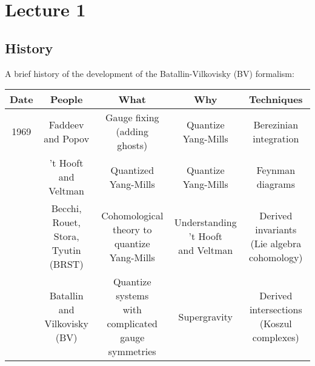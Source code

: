 \chapter{Lecture 1}

\section{History}

A brief history of the development of the Batallin-Vilkovisky (BV) formalism:

\begin{center}
  \begin{tabular}{ccccc}
    Date & People & What & Why & Techniques \\
    \midrule
    1969 &
    \makecell{ Faddeev \\ and Popov } &
    \makecell{ Gauge fixing \\ (adding ghosts) } &
    \makecell{ Quantize \\ Yang-Mills } &
    \makecell{ Berezinian \\ integration } \\
    \addlinespace
    1973 & 
    \makecell{ 't Hooft and \\ Veltman } &
    \makecell{ Quantized \\ Yang-Mills } &
    \makecell{ Quantize \\ Yang-Mills } &
    \makecell{ Feynman \\ diagrams } \\
    \addlinespace
    1975 &
    \makecell{ Becchi, Rouet, \\ Stora, Tyutin \\ (BRST) } &
    \makecell{ Cohomological \\ theory to quantize \\ Yang-Mills } &
    \makecell{ Understanding \\ 't Hooft \\ and Veltman } &
    \makecell{ Derived invariants \\ (Lie algebra \\ cohomology) } \\
    \addlinespace
    1981 &
    \makecell{ Batallin and \\ Vilkovisky \\ (BV) } &
    \makecell{ Quantize systems \\ with complicated \\ gauge symmetries } &
    Supergravity &
    \makecell{ Derived \\ intersections \\ (Koszul complexes) } \\

\end{tabular}
\end{center}
